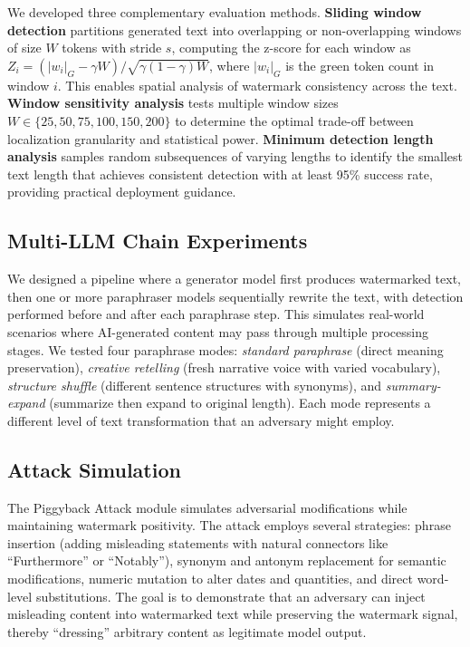 \documentclass[12pt,letterpaper]{article}
\begin{document}
We developed three complementary evaluation methods. \textbf{Sliding window detection} partitions generated text into overlapping or non-overlapping windows of size $W$ tokens with stride $s$, computing the z-score for each window as $Z_i = (|w_i|_G - \gamma W) / \sqrt{\gamma(1-\gamma)W}$, where $|w_i|_G$ is the green token count in window $i$. This enables spatial analysis of watermark consistency across the text. \textbf{Window sensitivity analysis} tests multiple window sizes $W \in \{25, 50, 75, 100, 150, 200\}$ to determine the optimal trade-off between localization granularity and statistical power. \textbf{Minimum detection length analysis} samples random subsequences of varying lengths to identify the smallest text length that achieves consistent detection with at least 95\% success rate, providing practical deployment guidance.

\subsection{Multi-LLM Chain Experiments}

We designed a pipeline where a generator model first produces watermarked text, then one or more paraphraser models sequentially rewrite the text, with detection performed before and after each paraphrase step. This simulates real-world scenarios where AI-generated content may pass through multiple processing stages. We tested four paraphrase modes: \textit{standard paraphrase} (direct meaning preservation), \textit{creative retelling} (fresh narrative voice with varied vocabulary), \textit{structure shuffle} (different sentence structures with synonyms), and \textit{summary-expand} (summarize then expand to original length). Each mode represents a different level of text transformation that an adversary might employ.

\subsection{Attack Simulation}

The Piggyback Attack module simulates adversarial modifications while maintaining watermark positivity. The attack employs several strategies: phrase insertion (adding misleading statements with natural connectors like ``Furthermore'' or ``Notably''), synonym and antonym replacement for semantic modifications, numeric mutation to alter dates and quantities, and direct word-level substitutions. The goal is to demonstrate that an adversary can inject misleading content into watermarked text while preserving the watermark signal, thereby ``dressing'' arbitrary content as legitimate model output.
\end{document}
